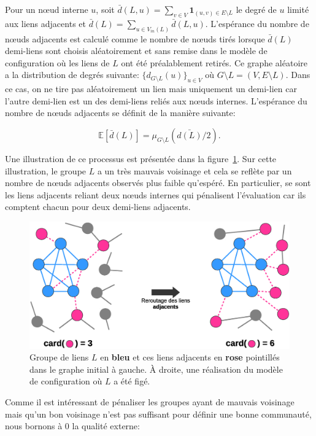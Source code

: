 Pour un n\oe ud interne $u$, soit $\bar{d}(L,u) = \sum_{v \in V} \mathbf{1}_{(u,v) \in E \setminus L}$ le degré de $u$ limité aux liens adjacents et $\bar{d}(L)=\sum_{u \in V_{in}(L)} \bar{d}(L,u)$.
L'espérance du nombre de n\oe uds adjacents est calculé comme le nombre de n\oe uds tirés lorsque $\bar{d}(L)$ demi-liens sont choisis aléatoirement et sans remise dans le modèle de configuration où les liens de $L$ ont été préalablement retirés.
Ce graphe aléatoire a la distribution de degrés suivante: $\{d_{G \setminus L }(u)\}_{u \in V}$ où $G \setminus L = (V,E\setminus L)$.
Dans ce cas, on ne tire pas aléatoirement un lien mais uniquement un demi-lien car l'autre demi-lien est un des demi-liens reliés aux n\oe uds internes.
L'espérance du nombre de n\oe uds adjacents se définit de la manière suivante:

\begin{equation}
	\mathbb{E}[\bar{d}(L)] = \mu_{G\setminus L}(\bar{d(L)}/2).
\end{equation}

Une illustration de ce processus est présentée dans la figure~\ref{fig:retourt_ext}.
Sur cette illustration, le groupe $L$ a un très mauvais voisinage et cela se reflète par un nombre de n\oe uds adjacents observés plus faible qu'espéré.
En particulier, se sont les liens adjacents reliant deux n\oe uds internes qui pénalisent l'évaluation car ils comptent chacun pour deux demi-liens adjacents.

\begin{figure}
\centering
\includegraphics[width=0.7\linewidth]{img/ExpectedNodes/reroutageExt3}
\caption{Groupe de liens $L$ en \textcolor{semilightblue}{\textbf{bleu}} et ces liens adjacents en \textcolor{pinkyred}{\textbf{rose}} pointillés dans le graphe initial à gauche.
\`A droite, une réalisation du modèle de configuration où $L$ a été figé.}
\label{fig:retourt_ext}
\end{figure}

Comme il est intéressant de pénaliser les groupes ayant de mauvais voisinage mais qu'un bon voisinage n'est pas suffisant pour définir une bonne communauté, nous bornons à $0$ la qualité externe:

